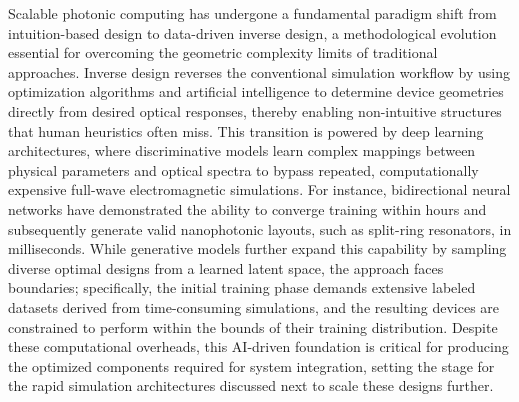 Scalable photonic computing has undergone a fundamental paradigm shift from intuition-based design to data-driven inverse design, a methodological evolution essential for overcoming the geometric complexity limits of traditional approaches. Inverse design reverses the conventional simulation workflow by using optimization algorithms and artificial intelligence to determine device geometries directly from desired optical responses, thereby enabling non-intuitive structures that human heuristics often miss. \citep{doi_10_1117_12_3066105_d6297c38} \citep{doi_10_48550_arxiv_2506_18627_e2696034} This transition is powered by deep learning architectures, where discriminative models learn complex mappings between physical parameters and optical spectra to bypass repeated, computationally expensive full-wave electromagnetic simulations. For instance, bidirectional neural networks have demonstrated the ability to converge training within hours and subsequently generate valid nanophotonic layouts, such as split-ring resonators, in milliseconds. While generative models further expand this capability by sampling diverse optimal designs from a learned latent space, the approach faces boundaries; specifically, the initial training phase demands extensive labeled datasets derived from time-consuming simulations, and the resulting devices are constrained to perform within the bounds of their training distribution. Despite these computational overheads, this AI-driven foundation is critical for producing the optimized components required for system integration, setting the stage for the rapid simulation architectures discussed next to scale these designs further. \citep{doi_10_1515_nanoph_2021_0660_2d91a441} \citep{doi_10_1515_nanoph_2024_0536_4b6631ba}

